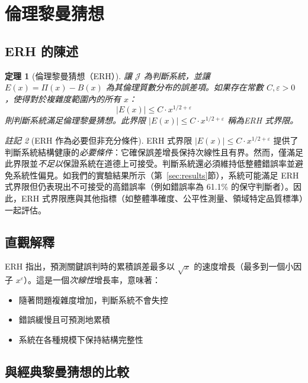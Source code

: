 \documentclass[12pt,a4paper]{article}
\newtheorem{theorem}{定理}[section]
\theoremstyle{definition}
\theoremstyle{remark}
\newtheorem{remark}[theorem]{註記}
\begin{document}
\section{倫理黎曼猜想}
\label{sec:erh}

\subsection{ERH 的陳述}

\begin{theorem}[倫理黎曼猜想（ERH）]
\label{thm:erh}
讓 $\mathcal{J}$ 為判斷系統，並讓 $E(x) = \Pi(x) - B(x)$ 為其倫理質數分布的誤差項。如果存在常數 $C, \varepsilon > 0$，使得對於複雜度範圍內的所有 $x$：
\[
|E(x)| \leq C \cdot x^{1/2 + \varepsilon}
\]
則判斷系統滿足\emph{倫理黎曼猜想}。此界限 $|E(x)| \leq C \cdot x^{1/2 + \varepsilon}$ 稱為\emph{ERH 式界限}。
\end{theorem}

\begin{remark}[ERH 作為必要但非充分條件]
\label{rem:erh_necessary}
ERH 式界限 $|E(x)| \leq C \cdot x^{1/2 + \varepsilon}$ 提供了判斷系統結構健康的\emph{必要條件}：它確保誤差增長保持次線性且有界。然而，僅滿足此界限並\emph{不足以}保證系統在道德上可接受。判斷系統還必須維持低整體錯誤率並避免系統性偏見。如我們的實驗結果所示（第~\ref{sec:results}節），系統可能滿足 ERH 式界限但仍表現出不可接受的高錯誤率（例如錯誤率為 61.1\% 的保守判斷者）。因此，ERH 式界限應與其他指標（如整體準確度、公平性測量、領域特定品質標準）一起評估。
\end{remark}

\subsection{直觀解釋}

ERH 指出，預測關鍵誤判時的累積誤差最多以 $\sqrt{x}$ 的速度增長（最多到一個小因子 $x^\varepsilon$）。這是一個\emph{次線性}增長率，意味著：

\begin{itemize}
    \item 隨著問題複雜度增加，判斷系統不會失控
    \item 錯誤緩慢且可預測地累積
    \item 系統在各種規模下保持結構完整性
\end{itemize}

\subsection{與經典黎曼猜想的比較}
\end{document}

